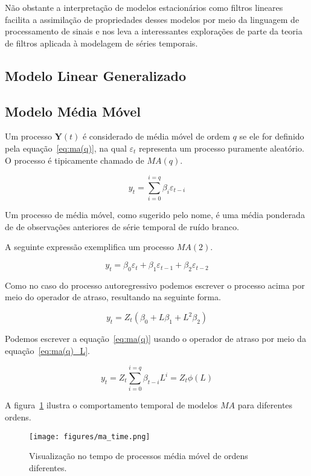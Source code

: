Não obstante a interpretação de modelos estacionários como filtros lineares
facilita a assimilação de propriedades desses modelos por meio da linguagem de
processamento de sinais e nos leva a interessantes explorações de parte da
teoria de filtros aplicada à modelagem de séries temporais.

\subsection{Modelo Linear Generalizado}
\label{sec:glm}

\subsection{Modelo Média Móvel}
\label{ssec:MA(p)}

Um processo $\mathbf{Y}(t)$ é considerado de média móvel de ordem $q$ se ele
for definido pela equação~\ref{eq:ma(q)}, na qual $\varepsilon_t$ representa um
processo puramente aleatório. O processo é tipicamente chamado de $MA(q)$.

\begin{equation}\label{eq:ma(q)}
    y_t = \sum_{i=0}^{i=q} \beta_i \varepsilon_{t-i}
\end{equation}

Um processo de média móvel, como sugerido pelo nome, é uma média ponderada de
de observações anteriores de série temporal de ruído branco.

A seguinte expressão exemplifica um processo $MA(2)$.

$$ y_t = \beta_0 \varepsilon_t + \beta_1 \varepsilon_{t-1} + \beta_2 \varepsilon_{t-2} $$

Como no caso do processo autoregressivo podemos escrever o processo acima por
meio do operador de atraso, resultando na seguinte forma.

$$ y_t = Z_t (\beta_0 + L\beta_1 + L^2\beta_2) $$

Podemos escrever a equação~\ref{eq:ma(q)} usando o operador de atraso por meio
da equação~\ref{eq:ma(q)_L}.

\begin{equation}\label{eq:ma(q)_L}
    y_t = Z_t \sum_{i=0}^{i=q} \beta_{t-i} L^{i} = Z_t \phi(L)
\end{equation}

A figura~\ref{fig:ma_time} ilustra o comportamento temporal de modelos $MA$ para
diferentes ordens.

\begin{figure}[H]
    \centering
    \texttt{[image: figures/ma\_time.png]}
    \caption{Visualização no tempo de processos média móvel de ordens
    diferentes.}
    \label{fig:ma_time}
\end{figure}


